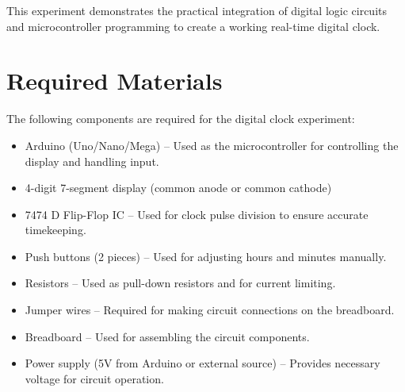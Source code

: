 \documentclass[a4paper,12pt]{article}
\begin{document}
This experiment demonstrates the practical integration of {digital logic circuits} and {microcontroller programming} to create a working real-time digital clock.


\section{Required Materials}

The following components are required for the digital clock experiment:

\begin{itemize}
    \item {Arduino (Uno/Nano/Mega)} – Used as the microcontroller for controlling the display and handling input.
    \item {4-digit 7-segment display (common anode or common cathode)}
    \item {7474 D Flip-Flop IC} – Used for clock pulse division to ensure accurate timekeeping.
    \item {Push buttons (2 pieces)} – Used for adjusting hours and minutes manually.
    \item {Resistors} – Used as pull-down resistors and for current limiting.
    \item {Jumper wires} – Required for making circuit connections on the breadboard.
    \item {Breadboard} – Used for assembling the circuit components.
    \item {Power supply (5V from Arduino or external source)} – Provides necessary voltage for circuit operation.
\end{itemize}
 
\end{document}
